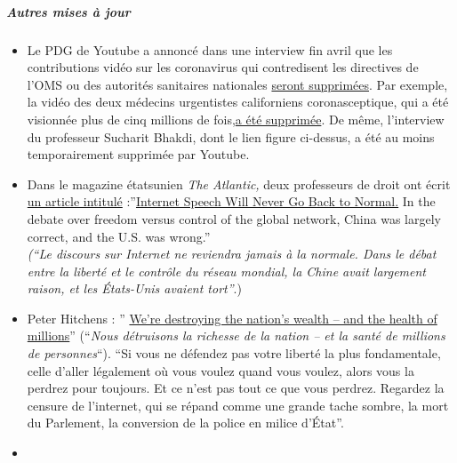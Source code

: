 \hypertarget{autres-mises-uxe0-jour}{%
\subparagraph{\texorpdfstring{\textbf{Autres mises à
jour}}{Autres mises à jour}}\label{autres-mises-uxe0-jour}}

\begin{itemize}
\tightlist
\item
  Le PDG de Youtube a annoncé dans une interview fin avril que les
  contributions vidéo sur les coronavirus qui contredisent les
  directives de l'OMS ou des autorités sanitaires nationales
  \href{https://www.businessinsider.com/youtube-will-ban-anything-against-who-guidance-2020-4}{seront
  supprimées}. Par exemple, la vidéo des deux médecins urgentistes
  californiens coronasceptique, qui a été visionnée plus de cinq
  millions de
  fois,\href{https://www.turnto23.com/news/coronavirus/video-interview-with-dr-dan-erickson-and-dr-artin-massihi-taken-down-from-youtube}{a
  été supprimée}. De même, l'interview du professeur Sucharit Bhakdi,
  dont le lien figure ci-dessus, a été au moins temporairement supprimée
  par Youtube.
\item
  Dans le magazine étatsunien \emph{The Atlantic,} deux professeurs de
  droit ont écrit
  \href{https://www.theatlantic.com/ideas/archive/2020/04/what-covid-revealed-about-internet/610549/}{un
  article intitulé}
  :''\href{https://www.theatlantic.com/ideas/archive/2020/04/what-covid-revealed-about-internet/610549/}{Internet
  Speech Will Never Go Back to Normal.} In the debate over freedom
  versus control of the global network, China was largely correct, and
  the U.S. was wrong.''\\
  \emph{(``Le discours sur Internet ne reviendra jamais à la normale.
  Dans le débat entre la liberté et le contrôle du réseau mondial, la
  Chine avait largement raison, et les États-Unis avaient tort''}.)
\item
  Peter Hitchens : ''
  \href{https://hitchensblog.mailonsunday.co.uk/2020/05/peter-hitchens-were-destroying-the-nations-wealth-and-the-health-of-millions.html}{We're
  destroying the nation's wealth -- and the health of millions}''
  (``\emph{Nous détruisons la richesse de la nation -- et la santé de
  millions de personnes}``). ``Si vous ne défendez pas votre liberté la
  plus fondamentale, celle d'aller légalement où vous voulez quand vous
  voulez, alors vous la perdrez pour toujours. Et ce n'est pas tout ce
  que vous perdrez. Regardez la censure de l'internet, qui se répand
  comme une grande tache sombre, la mort du Parlement, la conversion de
  la police en milice d'État''.
\item

\end{itemize}
